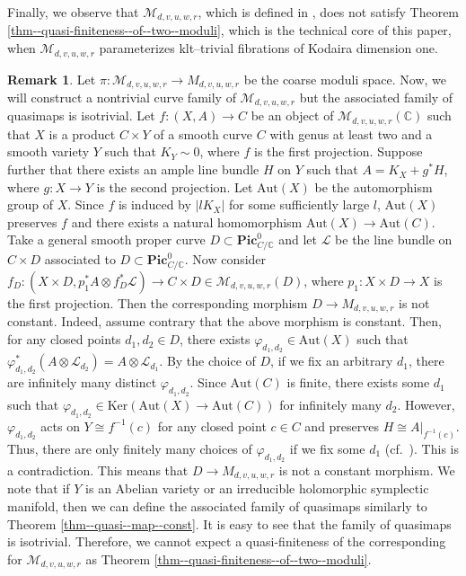 \documentclass[12pt,twoside]{amsart}
\theoremstyle{definition}
\newtheorem{rem}[thm]{Remark}
\begin{document}
Finally, we observe that $\mathcal{M}_{d,v,u,w,r}$, which is defined in \cite[Theorem 5.1]{HH}, does not satisfy Theorem \ref{thm--quasi-finiteness--of--two--moduli}, which is the technical core of this paper, when $\mathcal{M}_{d,v,u,w,r}$ parameterizes klt--trivial fibrations of Kodaira dimension one.
\begin{rem}\label{rem--final}
Let $\pi\colon \mathcal{M}_{d,v,u,w,r}\to M_{d,v,u,w,r}$ be the coarse moduli space. 
Now, we will construct a nontrivial curve family of $\mathcal{M}_{d,v,u,w,r}$ but the associated family of quasimaps is isotrivial.
Let $f\colon (X,A)\to C$ be an object of $\mathcal{M}_{d,v,u,w,r}(\mathbb{C})$ such that $X$ is a product $C\times Y$ of a smooth curve $C$ with genus at least two and a smooth variety $Y$ such that $K_Y\sim0$, where $f$ is the first projection.
Suppose further that there exists an ample line bundle $H$ on $Y$ such that $A=K_X+g^*H$, where $g\colon X\to Y$ is the second projection.
Let $\mathrm{Aut}(X)$ be the automorphism group of $X$.
Since $f$ is induced by $|lK_X|$ for some sufficiently large $l$, $\mathrm{Aut}(X)$ preserves $f$ and there exists a natural homomorphism $\mathrm{Aut}(X)\to \mathrm{Aut}(C)$.
Take a general smooth proper curve $D\subset \mathbf{Pic}^0_{C/\mathbb{C}}$ and let $\mathscr{L}$ be the line bundle on $C\times D$ associated to $D\subset \mathbf{Pic}^0_{C/\mathbb{C}}$.
Now consider $f_D\colon (X\times D,p_1^*A\otimes f_D^*\mathscr{L})\to C\times D\in \mathcal{M}_{d,v,u,w,r}(D)$, where $p_1\colon X\times D\to X$ is the first projection.
Then the corresponding morphism $D\to M_{d,v,u,w,r}$ is not constant.
Indeed, assume contrary that the above morphism is constant.
Then, for any closed points $d_1,d_2\in D$, there exists $\varphi_{d_1,d_2}\in \mathrm{Aut}(X)$ such that $\varphi_{d_1,d_2}^*(A\otimes \mathscr{L}_{d_2})=A\otimes \mathscr{L}_{d_1}$.
By the choice of $D$, if we fix an arbitrary $d_1$, there are infinitely many distinct $\varphi_{d_1,d_2}$.
Since $\mathrm{Aut}(C)$ is finite, there exists some $d_1$ such that $\varphi_{d_1,d_2}\in \mathrm{Ker}(\mathrm{Aut}(X)\to \mathrm{Aut}(C))$ for infinitely many $d_2$.
However, $\varphi_{d_1,d_2}$ acts on $Y\cong f^{-1}(c)$ for any closed point $c\in C$ and preserves $H\cong A|_{f^{-1}(c)}$.
Thus, there are only finitely many choices of $\varphi_{d_1,d_2}$ if we fix some $d_1$ (cf.~\cite[Corollary 3.23]{CM}).
This is a contradiction.
This means that $D\to M_{d,v,u,w,r}$ is not a constant morphism.
We note that if $Y$ is an Abelian variety or an irreducible holomorphic symplectic manifold, then we can define the associated family of quasimaps similarly to Theorem \ref{thm--quasi--map--const}.
It is easy to see that the family of quasimaps is isotrivial.
Therefore, we cannot expect a quasi-finiteness of the corresponding for $\mathcal{M}_{d,v,u,w,r}$ as Theorem \ref{thm--quasi-finiteness--of--two--moduli}.



\end{rem}
\end{document}
